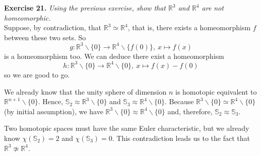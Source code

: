 \documentclass{article}
\begin{document}
    \noindent \textbf{Exercise 21.} \textit{Using the previous exercise, show that $\mathbb{R}^3$ and $\mathbb{R}^4$ are not homeomorphic.} \\

    Suppose, by contradiction, that $\mathbb{R}^3 \simeq \mathbb{R}^4$, that is, there exists a homeomorphism $f$ between these two sets.
    So $$g \colon \mathbb{R}^3 \backslash \{0\} \longrightarrow \mathbb{R}^4 \backslash \{f(0)\}, \ x \longmapsto f(x)$$
    is a homeomorphism too.
    We can deduce there exist a homeomorphism $$h \colon \mathbb{R}^3 \backslash \{0\} \longrightarrow \mathbb{R}^4 \backslash \{0\}, \ x \longmapsto f(x) - f(0)$$
    so we are good to go.

    We already know that the unity sphere of dimension $n$ is homotopic equivalent to $\mathbb{R}^{n+1} \backslash \{0\}$.
    Hence, $\mathbb{S}_2 \approx \mathbb{R}^3 \backslash \{0\}$ and $\mathbb{S}_3 \approx \mathbb{R}^4 \backslash \{0\}$.
    Because $\mathbb{R}^3 \backslash \{0\} \simeq \mathbb{R}^4 \backslash \{0\}$ (by initial assumption), we have $\mathbb{R}^3 \backslash \{0\} \approx \mathbb{R}^4 \backslash \{0\}$ and, therefore, $\mathbb{S}_2 \approx \mathbb{S}_3$.

    Two homotopic spaces must have the same Euler characteristic, but we already know $\chi(\mathbb{S}_2) = 2$ and $\chi(\mathbb{S}_3) = 0$.
    This contradiction leads us to the fact that $\mathbb{R}^3 \not\simeq \mathbb{R}^4$.
\end{document}
